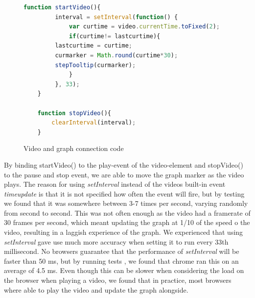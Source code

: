 \begin{figure}
	\begin{lstlisting}[language=javascript]
	function startVideo(){
	     interval = setInterval(function() {
	         var curtime = video.currentTime.toFixed(2);
	         if(curtime!= lastcurtime){
		 lastcurtime = curtime;
		 curmarker = Math.round(curtime*30);
		 stepTooltip(curmarker);
	         }
	     }, 33);
	}

	function stopVideo(){
		clearInterval(interval);
	}
	\end{lstlisting}
	\caption{Video and graph connection code}
	\label{fig:videocode}
\end{figure}

By binding startVideo() to the play-event of the video-element and stopVideo() to the pause and stop event, we are able to move the graph marker as the video plays. The reason for using \emph{setInterval} instead of the videos built-in event \emph{timeupdate} is that it is not specified how often the event will fire, but by testing we found that it was somewhere between 3-7 times per second, varying randomly from second to second. This was not often enough as the video had a framerate of 30 frames per second, which meant updating the graph at 1/10 of the speed o the video, resulting in a laggish experience of the graph. We experienced that using \emph{setInterval} gave use much more accuracy when setting it to run every 33th millisecond. No browsers guarantee that the performance of \emph{setInterval} will be faster than 50 ms, but by running tests \citep{adequatleyqood}, we found that chrome ran this on an average of 4.5 ms. Even though this can be slower when considering the load on the browser when playing a video, we found that in practice, most browsers where able to play the video and update the graph alongside. 
